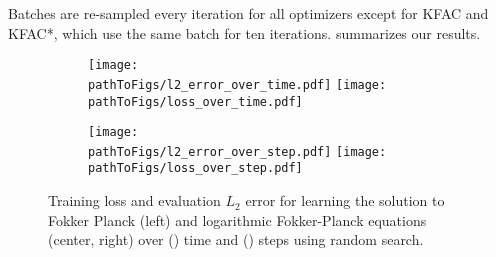 Batches are re-sampled every iteration for all optimizers except for KFAC and KFAC*, which use the same batch for ten iterations.
 summarizes our results.

\begin{figure}[!h]
  \centering
  \def\pathToFigs{kfac_pinns_exp/exp47_groupplot_fokker_planck_isotropic_gaussian_random}
  \begin{subfigure}[t]{1.0\linewidth}
    \caption{}\label{subfig:fokker-planck-random-time}
    \texttt{[image: \\pathToFigs/l2\_error\_over\_time.pdf]}
    \texttt{[image: \\pathToFigs/loss\_over\_time.pdf]}
  \end{subfigure}
  \begin{subfigure}[t]{1.0\linewidth}
    \caption{}\label{subfig:fokker-planck-random-step}
    \texttt{[image: \\pathToFigs/l2\_error\_over\_step.pdf]}
    \texttt{[image: \\pathToFigs/loss\_over\_step.pdf]}
  \end{subfigure}
  \caption{Training loss and evaluation $L_2$ error for learning the solution to Fokker Planck (left) and logarithmic Fokker-Planck equations (center, right) over () time and () steps using random search.}\label{fig:fokker-planck-random-appendix}
\end{figure}

